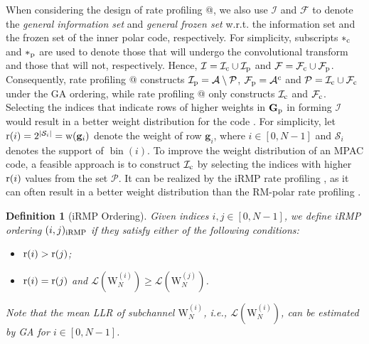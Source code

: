 \documentclass[12pt, draftclsnofoot, peerreview, onecolumn]{IEEEtran}
\makeatletter
\theoremstyle{noparent}
\newtheorem{definition}{\textbf{{Definition}}}
\newcommand{\Rmnum}[1]{\expandafter\@slowromancap\romannumeral #1@}
\DeclareMathOperator\bin{bin}
\makeatother
\begin{document}
When considering the design of rate profiling \Rmnum{1}, 
we also use $\mathcal{I}$ and $\mathcal{F}$ to 
denote the \textit{general information set} and \textit{general frozen set} 
w.r.t. the information set and the frozen set of the inner polar code, respectively.
For simplicity, subscripts $*_{\rm c}$ and $*_{\rm p}$ are used to denote those that will undergo 
the convolutional transform and those that will not, respectively. 
Hence, $\mathcal{I}=\mathcal{I}_{\rm c} \cup \mathcal{I}_{\rm p}$
and $\mathcal{F}=\mathcal{F}_{\rm c} \cup \mathcal{F}_{\rm p}$.
Consequently, rate profiling \Rmnum{2} constructs 
$\mathcal{I}_{\rm p}=\mathcal{A}\setminus \mathcal{P}$, 
$\mathcal{F}_{\rm p}=\mathcal{A}^c$ and 
$\mathcal{P}=\mathcal{I}_{\rm c} \cup \mathcal{F}_{\rm c}$ under the GA ordering, 
while rate profiling \Rmnum{1} only constructs $\mathcal{I}_{\rm c}$ and 
$\mathcal{F}_{\rm c}$.
Selecting the indices that indicate rows of higher weights in $\mathbf{G}_{\rm{p}}$ in forming $\mathcal{I}$ 
would result in a better weight distribution for the code \cite{Li2014RMPolarCodes}\cite{Rowshan2021PolarizationAdjustedConvolutional}.
For simplicity, let ${\rm r}(i)=2^{|\mathcal{S}_i|}={\rm w}(\mathbf{g}_i)$ denote the weight of row $\mathbf{g}_i$, where $i\in[0,N-1]$ and $\mathcal{S}_i$ denotes the support of $\bin(i)$.
To improve the weight distribution of an MPAC code, 
a feasible approach is to construct $\mathcal{I}_{\rm c}$
by selecting the indices with higher ${\rm r}(i)$ values from the set $\mathcal{P}$.
It can be realized by the iRMP rate profiling \cite{Rowshan2021PolarizationAdjustedConvolutional},
as it can often
result in a better weight distribution 
than the RM-polar rate profiling \cite{Li2014RMPolarCodes}.














\begin{definition}[iRMP Ordering]
    \label{iRMP_ordering}
    Given indices $i, j\in[0,N-1]$, we define iRMP ordering $(i,j)_{\rm iRMP}$
    if they satisfy either of the following conditions:
    \begin{itemize}
        \item ${\rm r}(i)>{\rm r}(j)$;
        \item ${\rm r}(i)={\rm r}(j)$ and ${\mathcal{L}}(\mathrm{W}_{N}^{(i)})\geq {\mathcal{L}}(\mathrm{W}_{N}^{(j)})$.
    \end{itemize}
    Note that the mean LLR of subchannel $\mathrm{W}_{N}^{(i)}$, i.e., ${\mathcal{L}}(\mathrm{W}_{N}^{(i)})$, 
    can be estimated by GA for $i \in [0,N-1]$.
\end{definition}
\end{document}
